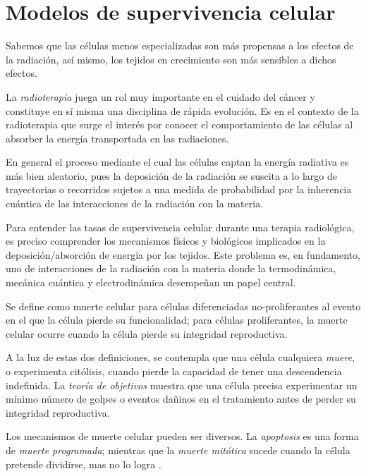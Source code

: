 \documentclass[12pt,letterpaper, oneside]{book}
\begin{document}
		\section{Modelos de supervivencia celular}
		Sabemos que las células menos especializadas son más propensas a los efectos de la radiación, así mismo, los tejidos en crecimiento son más sensibles a dichos efectos\cite{Prasad.1995}.
				
		La \textit{radioterapia} juega un rol muy importante en el cuidado del cáncer y constituye en sí misma una disciplina de rápida evolución\cite{Mayles.2007}. Es en el contexto de la radioterapia que surge el interés por conocer el comportamiento de las células al absorber la energía transportada en las radiaciones\cite{Mayles.2007}. 
		
		En general el proceso mediante el cual las células captan la energía radiativa es más bien aleatorio, pues la deposición de la radiación se suscita a lo largo de trayectorias o recorridos sujetos a una medida de probabilidad por la inherencia cuántica de las interacciones de la radiación con la materia\cite{Mayles.2007}. 
		
		Para entender las tasas de supervivencia celular durante una terapia radiológica, es preciso comprender los mecanismos físicos y biológicos implicados en la deposición/absorción de energía por los tejidos. Este problema es, en fundamento, uno de interacciones de la radiación con la materia donde la termodinámica, mecánica cuántica y electrodinámica desempeñan un papel central. 
			
		Se define como muerte celular para células diferenciadas no-proliferantes al evento en el que la célula pierde su funcionalidad\cite{Hall.2000, Tubiana.1990}; para células proliferantes, la muerte celular ocurre cuando la célula pierde su integridad reproductiva\cite{Hall.2000, Tubiana.1990}. 
		
		A la luz de estas dos definiciones, se contempla que una célula cualquiera \textit{muere}, o experimenta citólisis, cuando pierde la capacidad de tener una descendencia indefinida\cite{Hall.2000, Tubiana.1990}. La \textit{teoría de objetivos} muestra que una célula precisa experimentar un mínimo número de golpes o eventos dañinos en el tratamiento antes de perder su integridad reproductiva\cite{Bleehen.2007}. 
		
		Los mecanismos de muerte celular pueden ser diversos. La \textit{apoptosis} es una forma de \textit{muerte programada}; mientras que la \textit{muerte mitótica} sucede cuando la célula pretende dividirse, mas no lo logra \cite{Hall.2000, Tubiana.1990}. 
		
\end{document}
